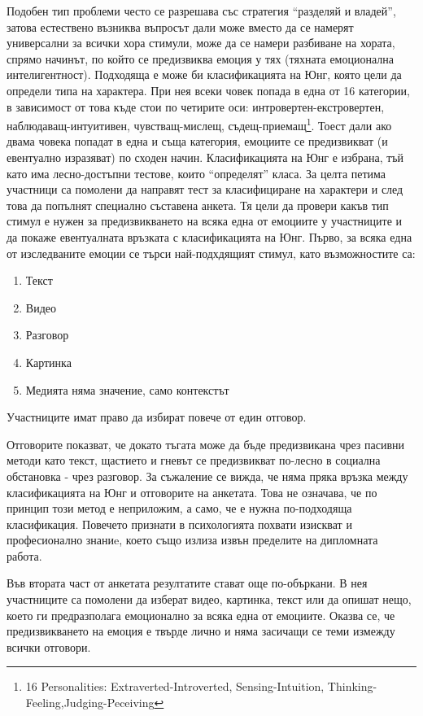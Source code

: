 \documentclass[main.tex]{subfiles}
\begin{document}
Подобен тип проблеми често се разрешава със стратегия ``разделяй и владей'', затова естествено възниква въпросът дали може вместо да се намерят универсални за всички хора стимули, може да се намери разбиване на хората, спрямо начинът, по който се предизвиква емоция у тях (тяхната емоционална интелигентност). Подходяща е може би класификацията на Юнг, която цели да определи типа на характера. При нея всеки човек попада в една от 16 категории, в зависимост от това къде стои по четирите оси: интровертен-екстровертен, наблюдаващ-интуитивен,  чувстващ-мислещ, съдещ-приемащ\footnote{16 Personalities: Extraverted-Introverted, Sensing-Intuition, Thinking-Feeling,Judging-Peceiving}. Тоест дали ако двама човека попадат в една и съща категория, емоциите се предизвикват (и евентуално изразяват) по сходен начин. Класификацията на Юнг е избрана, тъй като има лесно-достъпни тестове, които ``определят'' класа. 
За целта петима участници са помолени да направят тест за класифициране на характери и след това да попълнят специално съставена анкета. Тя цели да провери какъв тип стимул е нужен за предизвикването на всяка една от емоциите у участниците и да покаже евентуалната връзката с класификацията на Юнг.
Първо, за всяка една от изследваните емоции се търси най-подхдящият стимул, като възможностите са:
\begin{enumerate}
    \item Текст
    \item Видео
    \item Разговор
    \item Картинка
    \item Медията няма значение, само контекстът
\end{enumerate}
Участниците имат право да избират повече от един отговор.

Отговорите показват, че докато тъгата може да бъде предизвикана чрез пасивни методи като текст, щастието и гневът се предизвикват по-лесно в социална обстановка - чрез разговор. За съжаление се вижда, че няма пряка връзка между класификацията на Юнг и отговорите на анкетата. Това не означава, че по принцип този метод е неприложим, а само, че е нужна по-подходяща класификация. Повечето признати в психологията похвати изискват и професионално знаниe, което също излиза извън пределите на дипломната работа.

Във втората част от анкетата резултатите стават още по-объркани. В нея участниците са помолени да изберат видео, картинка, текст или да опишат нещо, което ги предразполага емоционално за всяка една от емоциите. Оказва се, че предизвикването на емоция е твърде лично и няма засичащи се теми измежду всички отговори.
\end{document}
